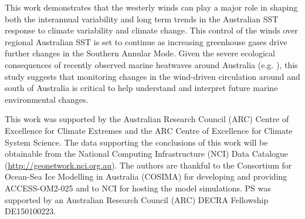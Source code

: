 \documentclass[draft,linenumbers]{agujournal2018}
\begin{document}
This work demonstrates that the westerly winds can play a major role in shaping both the interannual variability and long term trends in the Australian SST response to climate variability and climate change. This control of the winds over regional Australian SST is set to continue as increasing greenhouse gases drive further changes in the Southern Annular Mode. Given the severe ecological consequences of recently observed marine heatwaves around Australia (e.g. \citealp{Feng2013,Oliver2017}), this study suggests that monitoring changes in the wind-driven circulation around and south of Australia is critical to help understand and interpret future marine environmental changes.

\acknowledgments
This work was supported by the Australian Research Council (ARC) Centre of Excellence for Climate Extremes and the ARC Centre of Excellence for Climate System Science. The data supporting the conclusions of this work will be obtainable from the National Computing Infrastructure (NCI) Data Catalogue (\url{http://geonetwork.nci.org.au}). The authors are thankful to the Consortium for Ocean-Sea Ice Modelling in Australia (COSIMA) for developing and providing ACCESS-OM2-025 and to NCI for hosting the model simulations. PS was supported by an Australian Research Council (ARC) DECRA Fellowship DE150100223.
 


\appendix
\end{document}
